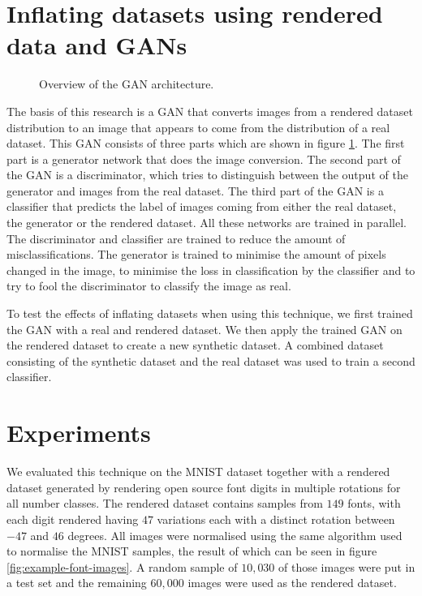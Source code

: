 \documentclass[10pt,twocolumn,letterpaper]{article}
\begin{document}
\section{Inflating datasets using rendered data and GANs}

\begin{figure}[h]
\begin{center}
{\scriptsize }
\end{center}
   \caption{Overview of the GAN architecture.}
\label{fig:gan-architecture}
\end{figure}

The basis of this research is a GAN that converts images from a rendered dataset distribution to an image that appears to come from the distribution of a real dataset. This GAN consists of three parts which are shown in figure \ref{fig:gan-architecture}. The first part is a generator network that does the image conversion. The second part of the GAN is a discriminator, which tries to distinguish between the output of the generator and images from the real dataset. The third part of the GAN is a classifier that predicts the label of images coming from either the real dataset, the generator or the rendered dataset. All these networks are trained in parallel. The discriminator and classifier are trained to reduce the amount of misclassifications. The generator is trained to minimise the amount of pixels changed in the image, to minimise the loss in classification by the classifier and to try to fool the discriminator to classify the image as real.

To test the effects of inflating datasets when using this technique, we first trained the GAN with a real and rendered dataset. We then apply the trained GAN on the rendered dataset to create a new synthetic dataset. A combined dataset consisting of the synthetic dataset and the real dataset was used to train a second classifier.

\section{Experiments}


We evaluated this technique on the MNIST dataset \cite{mnist} together with a rendered dataset generated by rendering open source font digits in multiple rotations for all number classes.
The rendered dataset contains samples from $149$ fonts, with each digit rendered having $47$ variations each with a distinct rotation between $-47$ and $46$ degrees. All images were normalised using the same algorithm used to normalise the MNIST samples, the result of which can be seen in figure \ref{fig:example-font-images}. A random sample of $10,030$ of those images were put in a test set and the remaining $60,000$ images were used as the rendered dataset.
\end{document}
